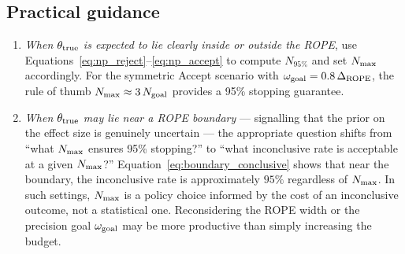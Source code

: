 \subsection*{Practical guidance}

\begin{enumerate}[label=(\alph*)]
    \item \textit{When $\theta_{\rm true}$ is expected to lie clearly inside or outside the
    ROPE}, use Equations~\ref{eq:np_reject}--\ref{eq:np_accept} to compute $N_{95\%}$ and
    set $N_{\rm max}$ accordingly.
    For the symmetric Accept scenario with $\omega_{\rm goal} = 0.8\,\Delta_{\rm ROPE}$,
    the rule of thumb $N_{\rm max} \approx 3\,N_{\rm goal}$ provides a 95\% stopping
    guarantee.

    \item \textit{When $\theta_{\rm true}$ may lie near a ROPE boundary} --- signalling that
    the prior on the effect size is genuinely uncertain --- the appropriate question shifts
    from ``what $N_{\rm max}$ ensures 95\% stopping?'' to ``what inconclusive rate is
    acceptable at a given $N_{\rm max}$?''
    Equation~\ref{eq:boundary_conclusive} shows that near the boundary, the inconclusive rate
    is approximately $95\%$ regardless of $N_{\rm max}$.
    In such settings, $N_{\rm max}$ is a policy choice informed by the cost of
    an inconclusive outcome, not a statistical one.
    Reconsidering the ROPE width or the precision goal $\omega_{\rm goal}$ may be more
    productive than simply increasing the budget.
\end{enumerate}
